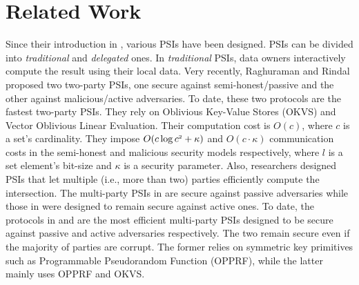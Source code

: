 
\vs
\vs

\section{Related Work}\label{sec::related-work}


Since their introduction in \cite{DBLP:conf/eurocrypt/FreedmanNP04}, various PSIs have been designed. PSIs can be divided into \textit{traditional} and \textit{delegated} ones.   
%
In \textit{traditional} PSIs, data owners interactively compute the result using their local data. 
%
Very recently, Raghuraman and Rindal \cite{RaghuramanR22} proposed two two-party PSIs, one secure against semi-honest/passive and the other against malicious/active adversaries. To date, these two protocols are the fastest two-party PSIs. They rely on  Oblivious Key-Value Stores (OKVS)  and Vector Oblivious Linear Evaluation. Their  computation cost is $O(c)$, where $c$ is  a set's cardinality.  They impose $O(c\log c^{\scriptscriptstyle 2}+\kappa)$ and $O(c\cdot \kappa)$ communication costs in the semi-honest and malicious security models respectively, where $l$ is a set element's bit-size and  $\kappa$ is a security parameter.  
%
Also, researchers designed PSIs that let multiple (i.e., more than two) parties efficiently compute the intersection. The multi-party PSIs in  \cite{DBLP:conf/scn/InbarOP18,DBLP:conf/ccs/KolesnikovMPRT17} are secure against  passive adversaries while those in \cite{Ben-EfraimNOP21,GhoshN19,ZhangLLJL19,DBLP:conf/ccs/KolesnikovMPRT17,NevoTY21} were designed to remain secure against  active ones.  To date, the  protocols  in   \cite{DBLP:conf/ccs/KolesnikovMPRT17} and  \cite{NevoTY21} are the most  efficient multi-party PSIs  designed to be  secure against passive and active  adversaries respectively. The two remain secure even if the majority of parties are corrupt.  
%
%
The former relies on symmetric key primitives such as  Programmable Pseudorandom Function (OPPRF), while the latter mainly uses OPPRF and OKVS. 

